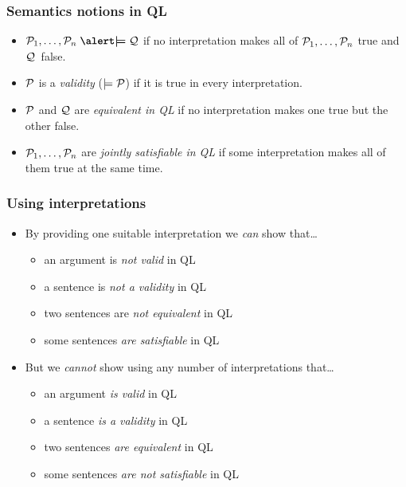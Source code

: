 \begin{frame}
\frametitle{Semantics notions in QL}

\begin{itemize}[<+->]
  \item $\metav{P}_1,\dots,\metav{P}_n \mathrel{\emph{$\boldsymbol\models$}} \metav{Q}$ if no interpretation
  makes all of $\mathcal{P}_1,\dots,\mathcal{P}_n$ true and $\mathcal{Q}$~false.
  \item $\mathcal{P}$ is a \emph{validity} ($\models \mathcal{P}$) if it is true in every interpretation.
  \item $\mathcal{P}$ and $\mathcal{Q}$ are \emph{equivalent in QL} if no
 interpretation makes one true but the other false.
 \item $\mathcal{P}_1,\dots,\mathcal{P}_n$ are \emph{jointly satisfiable
 in QL} if some interpretation makes all of them true at the same time.
\end{itemize}
\end{frame}

\begin{frame}
\frametitle{Using interpretations}

\begin{itemize}[<+->]
\item By providing one suitable interpretation we \emph{can} show that\dots
\begin{itemize}[<+->]
  \item an argument is \emph{not valid} in QL
  \item a sentence is \emph{not a validity} in QL
  \item two sentences are \emph{not equivalent} in QL
  \item some sentences \emph{are satisfiable} in QL
\end{itemize}
\item But we \emph{cannot} show using any number of interpretations that\dots
\begin{itemize}[<+->]
  \item an argument \emph{is valid} in QL
  \item a sentence \emph{is a validity} in QL
  \item two sentences \emph{are equivalent} in QL
  \item some sentences \emph{are not satisfiable} in QL
\end{itemize}
\end{itemize}
\end{frame}


